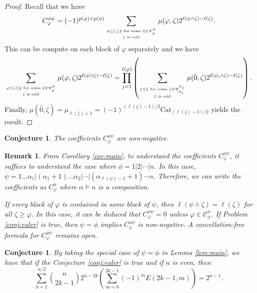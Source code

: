 \documentclass[11pt]{amsart}
\newtheorem{Remark}[Theorem]{Remark}
\newtheorem{Conjecture}[Theorem]{Conjecture}
\numberwithin{equation}{section}
\newcommand{\Cat}{\mathrm{Cat}}
\begin{document}
\begin{proof}
	Recall that we have
	$$C_\varphi^{\phi\psi}=(-1)^{p(\varphi)+p(\phi)}\sum_{\varphi\leq\zeta\leq\xi\text{ for some }\xi\in\mathscr{C}_\phi^\psi \atop \zeta\text{ is odd}}\mu(\varphi,\zeta)2^{\ell(\psi\land\zeta)-\ell(\zeta)}.$$
	This can be compute on each block of $\varphi$ separately and we have
	\begin{align*}
		\sum_{\varphi\leq\zeta\leq\xi\text{ for some }\xi\in\mathscr{C}_\phi^\psi \atop \zeta\text{ is odd}}\mu(\varphi,\zeta)2^{\ell(\psi\land\zeta)-\ell(\zeta)}=\prod_{j=1}^{\ell(\varphi)}\left(\sum_{\zeta\leq\xi\text{ for some }\zeta\in\mathscr{C}_{\phi_j}^{\psi_j} \atop \zeta\text{ is odd}}\mu(\hat{0},\zeta)2^{\ell(\psi_i\land\zeta)-\ell(\zeta)}\right).
	\end{align*}
	Finally, $\mu(\hat{0},\zeta)=\mu_{\ell(\zeta)+1}=(-1)^{(\ell(\zeta)-1)/2}\Cat_{(\ell(\zeta)-1)/2}$ yields the result.
\end{proof}

\begin{Conjecture}
	The coefficients $C_\varphi^{\phi\psi}$ are non-negative. 
\end{Conjecture}

\begin{Remark}
	From Corollary \ref{cor:main}, to understand the coefficients $C_\varphi^{\phi\psi}$, it suffices to understand the case where $\phi=1|2|\cdots|n$. In this case, $\psi=1\dots \alpha_1|(\alpha_1+1)\dots \alpha_2|\cdots|(\alpha_{\ell(\psi)-1}+1)\cdots n$. Therefore, we can write the coefficients as $C^\alpha_\varphi$ where $\alpha\models n$ is a composition.
	
	If every block of $\varphi$ is contained in some block of $\psi$, then $\ell(\psi\land\zeta)=\ell(\zeta)$ for all $\zeta\geq\varphi$. In this case, it can be deduced that $C_\varphi^{\phi\psi}=0$ unless $\varphi\in\mathscr{C}_\phi^\psi$. If Problem \ref{conj:euler} is true, then $\psi=\phi$ implies $C_\varphi^{\phi\psi}$ is non-negative. A cancellation-free formula for $C_\varphi^{\phi\psi}$ remains open.
\end{Remark}

\begin{Conjecture}\label{conj:euler2}
	By taking the special case of $\psi=\phi$ in Lemma \ref{lem:main}, we have that
	if the Conjecture \ref{conj:euler} is true and if $n$ is even, then
	$$\sum_{k=1}^{n/2}\binom{n}{2k-1}2^{n-2k}\left(\sum_{m=0}^{2k-1}(-1)^mE(2k-1,m)\right)=2^{n-1}.$$
\end{Conjecture}
\end{document}
